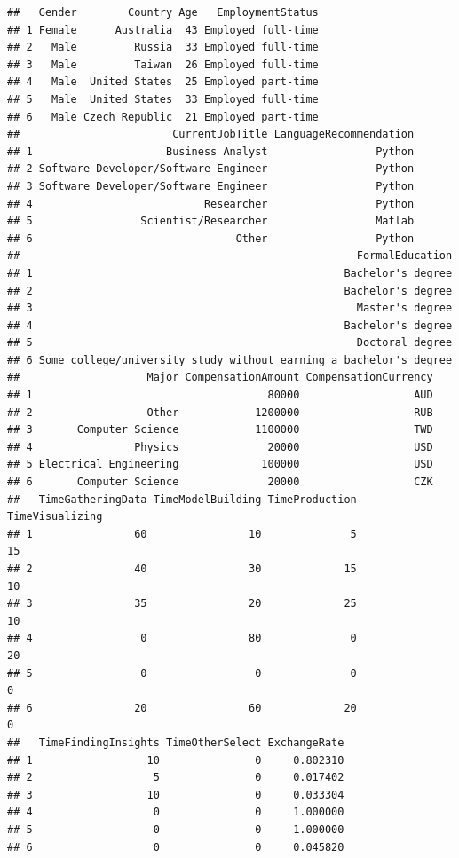 \documentclass[
]{book}
\begin{document}
\begin{verbatim}
##   Gender        Country Age   EmploymentStatus
## 1 Female      Australia  43 Employed full-time
## 2   Male         Russia  33 Employed full-time
## 3   Male         Taiwan  26 Employed full-time
## 4   Male  United States  25 Employed part-time
## 5   Male  United States  33 Employed full-time
## 6   Male Czech Republic  21 Employed part-time
##                        CurrentJobTitle LanguageRecommendation
## 1                     Business Analyst                 Python
## 2 Software Developer/Software Engineer                 Python
## 3 Software Developer/Software Engineer                 Python
## 4                           Researcher                 Python
## 5                 Scientist/Researcher                 Matlab
## 6                                Other                 Python
##                                                     FormalEducation
## 1                                                 Bachelor's degree
## 2                                                 Bachelor's degree
## 3                                                   Master's degree
## 4                                                 Bachelor's degree
## 5                                                   Doctoral degree
## 6 Some college/university study without earning a bachelor's degree
##                    Major CompensationAmount CompensationCurrency
## 1                                     80000                  AUD
## 2                  Other            1200000                  RUB
## 3       Computer Science            1100000                  TWD
## 4                Physics              20000                  USD
## 5 Electrical Engineering             100000                  USD
## 6       Computer Science              20000                  CZK
##   TimeGatheringData TimeModelBuilding TimeProduction TimeVisualizing
## 1                60                10              5              15
## 2                40                30             15              10
## 3                35                20             25              10
## 4                 0                80              0              20
## 5                 0                 0              0               0
## 6                20                60             20               0
##   TimeFindingInsights TimeOtherSelect ExchangeRate
## 1                  10               0     0.802310
## 2                   5               0     0.017402
## 3                  10               0     0.033304
## 4                   0               0     1.000000
## 5                   0               0     1.000000
## 6                   0               0     0.045820
\end{verbatim}
\end{document}
